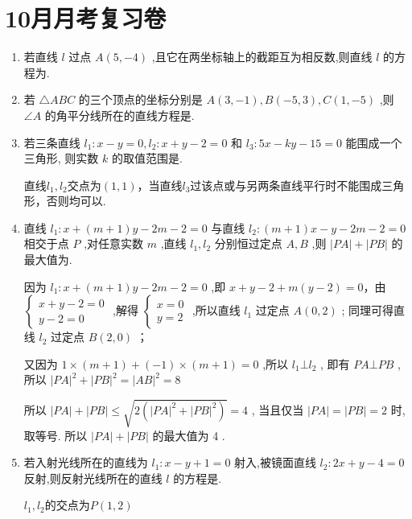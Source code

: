\section*{10月月考复习卷}
\begin{enumerate}
    \item 若直线 $l$ 过点 $A\left( {5, - 4}\right)$ ,且它在两坐标轴上的截距互为相反数,则直线 $l$ 的方程为.
    \item 若 $\bigtriangleup {ABC}$ 的三个顶点的坐标分别是 $A\left( {3, - 1}\right) ,B\left( {-5,3}\right) ,C\left( {1, - 5}\right)$ ,则 $\angle A$ 的角平分线所在的直线方程是.
    \item 若三条直线 ${l}_{1} : x - y = 0,{l}_{2} : x + y - 2 = 0$ 和 ${l}_{3} : {5x} - {ky} - {15} = 0$ 能围成一个三角形, 则实数 $k$ 的取值范围是.
    \begin{jieda}
        直线$l_1, l_2$交点为$(1, 1)$，当直线$l_3$过该点或与另两条直线平行时不能围成三角形，否则均可以.
    \end{jieda}
    \item 直线 ${l}_{1} : x + \left( {m + 1}\right) y - {2m} - 2 = 0$ 与直线 ${l}_{2} : \left( {m + 1}\right) x - y - {2m} - 2 = 0$ 相交于点 $P$ ,对任意实数 $m$ ,直线 ${l}_{1},{l}_{2}$ 分别恒过定点 $A,B$ ,则 $\left| {PA}\right|  + \left| {PB}\right|$ 的最大值为.
    \begin{jieda}
        因为 ${l}_{1} : x + \left( {m + 1}\right) y - {2m} - 2 = 0$ ,即 $x + y - 2 + m\left( {y - 2}\right)  = 0$，由 $\left\{  \begin{array}{l} x + y - 2 = 0 \\  y - 2 = 0 \end{array}\right.$ ,解得 $\left\{  \begin{array}{l} x = 0 \\  y = 2 \end{array}\right.$ ,所以直线 ${l}_{1}$ 过定点 $A\left( {0,2}\right)$ ;
        同理可得直线 ${l}_{2}$ 过定点 $B\left( {2,0}\right)$ ；
        
        又因为 $1 \times  \left( {m + 1}\right)  + \left( {-1}\right)  \times  \left( {m + 1}\right)  = 0$ ,所以 ${l}_{1} \bot  {l}_{2}$ ,
        即有 ${PA}\bot {PB}$ ,所以 ${\left| PA\right| }^{2} + {\left| PB\right| }^{2} = {\left| AB\right| }^{2} = 8$
        
        所以 $\left| {PA}\right|  + \left| {PB}\right|  \leq  \sqrt{2\left( {{\left| PA\right| }^{2} + {\left| PB\right| }^{2}}\right) } = 4$ ,
        当且仅当 $\left| {PA}\right|  = \left| {PB}\right|  = 2$ 时,取等号.
        所以 $\left| {PA}\right|  + \left| {PB}\right|$ 的最大值为 4 .
    \end{jieda}
    \item 若入射光线所在的直线为 ${l}_{1} : x - y + 1 = 0$ 射入,被镜面直线 ${l}_{2} : {2x} + y - 4 = 0$ 反射,则反射光线所在的直线 $l$ 的方程是.
    \begin{jieda}
        $l_1, l_2$的交点为$P(1,2)$
        

\end{jieda}
\end{enumerate}

